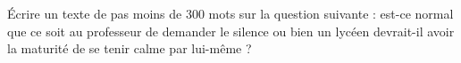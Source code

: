 
\begin{exercice}\label{exosmath-0429}

    Écrire un texte de pas moins de 300 mots sur la question suivante : est-ce normal que ce soit au professeur de demander le silence ou bien un lycéen devrait-il avoir la maturité de se tenir calme par lui-même ?

\end{exercice}
